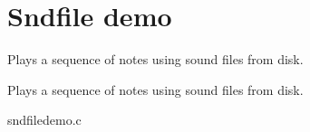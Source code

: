\section{Sndfile demo}
\label{group__sndfiledemo}


Plays a sequence of notes using sound files from disk.  


Plays a sequence of notes using sound files from disk. 
\begin{DoxyCodeInclude}
\end{DoxyCodeInclude}
 sndfiledemo.c 